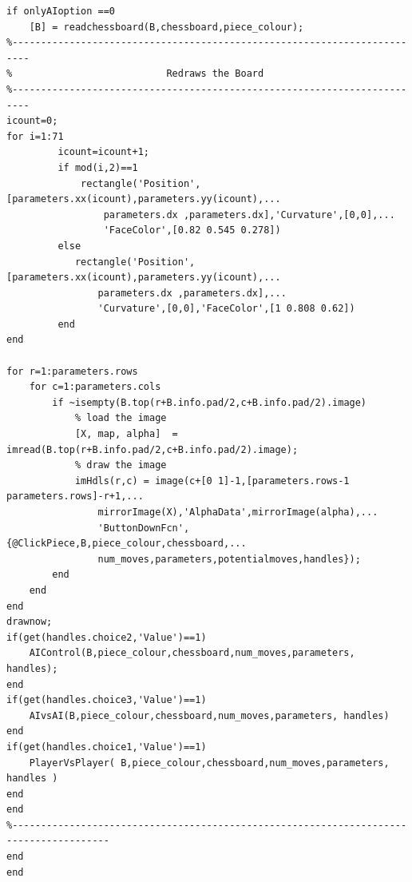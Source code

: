 \documentclass[11pt,a4paper]{article}
\begin{document}
\begin{lstlisting}
if onlyAIoption ==0
    [B] = readchessboard(B,chessboard,piece_colour);
%-------------------------------------------------------------------------
%                           Redraws the Board
%-------------------------------------------------------------------------
icount=0;
for i=1:71
         icount=icount+1;
         if mod(i,2)==1
             rectangle('Position',[parameters.xx(icount),parameters.yy(icount),...
                 parameters.dx ,parameters.dx],'Curvature',[0,0],...
                 'FaceColor',[0.82 0.545 0.278])
         else
            rectangle('Position',[parameters.xx(icount),parameters.yy(icount),...
                parameters.dx ,parameters.dx],...
                'Curvature',[0,0],'FaceColor',[1 0.808 0.62])             
         end
end

for r=1:parameters.rows
    for c=1:parameters.cols
        if ~isempty(B.top(r+B.info.pad/2,c+B.info.pad/2).image)
            % load the image
            [X, map, alpha]  = imread(B.top(r+B.info.pad/2,c+B.info.pad/2).image);
            % draw the image
            imHdls(r,c) = image(c+[0 1]-1,[parameters.rows-1 parameters.rows]-r+1,...
                mirrorImage(X),'AlphaData',mirrorImage(alpha),...
                'ButtonDownFcn',{@ClickPiece,B,piece_colour,chessboard,...
                num_moves,parameters,potentialmoves,handles});
        end
    end
end
drawnow;
if(get(handles.choice2,'Value')==1)
    AIControl(B,piece_colour,chessboard,num_moves,parameters, handles);
end
if(get(handles.choice3,'Value')==1)
    AIvsAI(B,piece_colour,chessboard,num_moves,parameters, handles)
end
if(get(handles.choice1,'Value')==1)
    PlayerVsPlayer( B,piece_colour,chessboard,num_moves,parameters, handles )
end
end
%---------------------------------------------------------------------------------------
end
end
\end{lstlisting}
\end{document}
